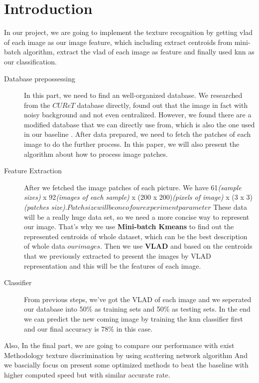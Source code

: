 \documentclass[final,leqno,onefignum,onetabnum]{siamltexmm}
\begin{document}
\section{Introduction}
In our project, we are going to implement the texture recognition by getting vlad of each image as our image feature, which including extract centroids from mini-batch algorithm, extract the vlad of each image as feature and finally used knn as our classification. 
\begin{description}
	\item[Database prepossessing]
	In this part, we need to find an well-organized database. We researched from the \(CUReT\) database \cite{dataref} directly, found out that the image in fact with noisy background and not even centralized. However, we found there are a modified database that we can directly use from, which is also the one used in our baseline \cite{dataref_mod}\cite{dataset_mod}.
	After data prepared, we need to fetch the patches of each image to do the further process. In this paper, we will also present the algorithm about how to process image patches.
	\item[Feature Extraction] After we fetched the image patches of each picture. We have 61\textit{(sample sizes)} x 92\textit{(images of each sample)} x (200 x 200)\textit{(pixels of image)} x (3 x 3)\textit{(patches size)}.\(Patch size will be one of our experiment parameter\) These data will be a really huge data set, so we need a more concise way to represent our image. That's why we use \textbf{Mini-batch Kmeans} to find out the represented centroids of whole dataset, which can be the best description of whole data \( our images\). Then we use \textbf{VLAD} and based on the centroids that we previously extracted to present the images by VLAD representation and this will be the features of each image.
	\item[Classifier] From previous steps, we've got the VLAD of each image and we seperated our database into 50\% as training sets and 50\% as testing sets. In the end we can predict the new coming image by training the knn classifier first and our final accuracy is 78\% in this case. 
\end{description}

Also, In the final part, we are going to compare our performance with exist Methodology texture discrimination by using scattering network algorithm \cite{baseline} And we bascially focus on present some optimized methods to beat the baseline with higher computed speed but with similar accurate rate.
\end{document}
